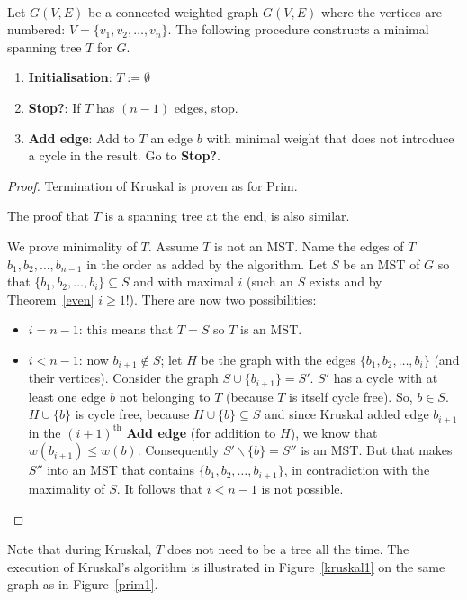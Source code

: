 \begin{code}[Kruskal] \label{kruskal}~\\
  Let $G(V,E)$ be a connected weighted graph $G(V,E)$ where the
vertices are numbered: $V = \{v_{1},v_{2},\ldots,v_{n}\}$. The
following procedure constructs a minimal spanning tree $T$ for $G$.
\begin{enumerate}
	\item \textbf{Initialisation}: $T := \emptyset$
	\item \textbf{Stop?}: If $T$ has $(n-1)$ edges, stop.
	\item \textbf{Add edge}: Add to $T$ an edge $b$ with minimal weight
	  that does not introduce a cycle in the result. Go to {\bf Stop?}.
\end{enumerate}
\end{code}
\begin{proof}
Termination of Kruskal is proven as for Prim.

The proof that $T$ is a spanning tree at the end, is also similar.

We prove minimality of $T$. Assume $T$ is not an MST.  Name the edges
of $T$ $b_{1},b_{2},\ldots ,b_{n-1}$ in the order as added by the
algorithm. Let $S$ be an MST of $G$ so that
%
$\{b_{1}, b_{2}, \ldots , b_{i}\} \subseteq S$ and with maximal $i$
(such an $S$ exists and by Theorem~\ref{even} $i \geq 1$!). There are
now two possibilities:
\begin{itemize}
\item
\textbf{$i = n-1$}: this means that $T = S$ so $T$ is an MST.
\item
\textbf{$i < n-1$}: now $b_{i+1} \notin S$; let $H$ be the graph with
the edges $\{b_{1}, b_{2}, \ldots , b_{i}\}$ (and their
vertices). Consider the graph $S \cup \{b_{i+1}\} = S'$. $S'$ has a
cycle with at least one edge $b$ not belonging to $T$ (because $T$ is
itself cycle free). So, $b \in S$. $H \cup \{b\}$ is cycle free,
because $H \cup \{b\} \subseteq S$ and since Kruskal added edge
$b_{i+1}$ in the $(i+1)^\text{th}$ \textbf{Add edge} (for addition to $H$),
we know that $w(b_{i+1}) \leq w(b)$. Consequently $S' \backslash \{b\}
= S''$ is an MST. But that makes $S''$ into an MST that contains
$\{b_{1}, b_{2}, \ldots , b_{i+1}\}$, in contradiction with the
maximality of $S$. It follows that $i < n-1$ is not possible.
\end{itemize}\vspace{-2em}
\end{proof}

Note that during Kruskal, $T$ does not need to be a tree all the
time. The execution of Kruskal's algorithm is illustrated in
Figure~\ref{kruskal1} on the same graph as in Figure~\ref{prim1}.

